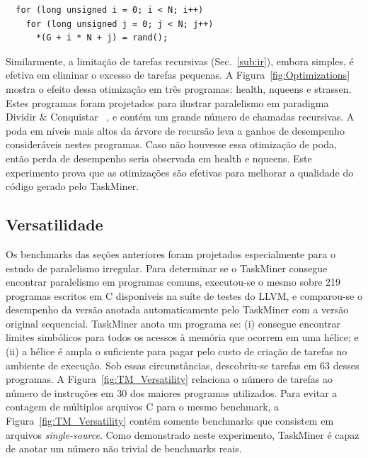 \documentclass[sigplan,10pt,review]{acmart}
\newcommand\Taskminer{\mbox{\textsf{TaskMiner}}}
\begin{document}
\begin{verbatim}
  for (long unsigned i = 0; i < N; i++)
    for (long unsigned j = 0; j < N; j++)
      *(G + i * N + j) = rand();
\end{verbatim}

Similarmente, a limitação de tarefas recursivas (Sec.~\ref{sub:ir}), embora simples,
é efetiva em eliminar o excesso de tarefas pequenas. A Figura~\ref{fig:Optimizations} mostra o efeito
dessa otimização em três programas: \textsf{health}, \textsf{nqueens} e
\textsf{strassen}. Estes programas foram projetados para ilustrar paralelismo
em paradigma Dividir \& Conquistar ~\cite{Duran09}, e contém um grande número de chamadas
recursivas. A poda em níveis mais altos da árvore de recursão leva a ganhos de desempenho consideráveis
nestes programas. Caso não houvesse essa otimização de poda, então perda de desempenho seria observada
em  \textsf{health} e \textsf{nqueens}. Este experimento prova que as otimizações são efetivas
para melhorar a qualidade do código gerado pelo \Taskminer{}.

\subsection{Versatilidade}
\label{sub:versatility}

Os benchmarks das seções anteriores foram projetados especialmente para o estudo de 
paralelismo irregular. Para determinar se o \Taskminer{} consegue encontrar paralelismo 
em programas comuns, executou-se o mesmo sobre 219 programas escritos em C disponíveis
na suíte de testes do LLVM, e comparou-se o desempenho da versão anotada automaticamente pelo
\Taskminer{} com a versão original sequencial. 
\Taskminer{} anota um programa se:
(i) consegue encontrar limites simbólicos para todos os acessos à memória que ocorrem em uma hélice; e
(ii) a hélice é ampla o suficiente para pagar pelo custo de criação de tarefas no ambiente de execução.
Sob essas circunstâncias, descobriu-se tarefas em 63 desses programas. A Figura~\ref{fig:TM_Versatility} relaciona
o número de tarefas ao número de instruções em 30 dos maiores programas utilizados.
Para evitar a contagem de múltiplos arquivos C para o mesmo benchmark, a Figura~\ref{fig:TM_Versatility} contém
somente benchmarks que consistem em arquivos {\em single-source}. Como demonstrado neste experimento,
\Taskminer{} é capaz de anotar um número não trivial de benchmarks reais.
\end{document}
